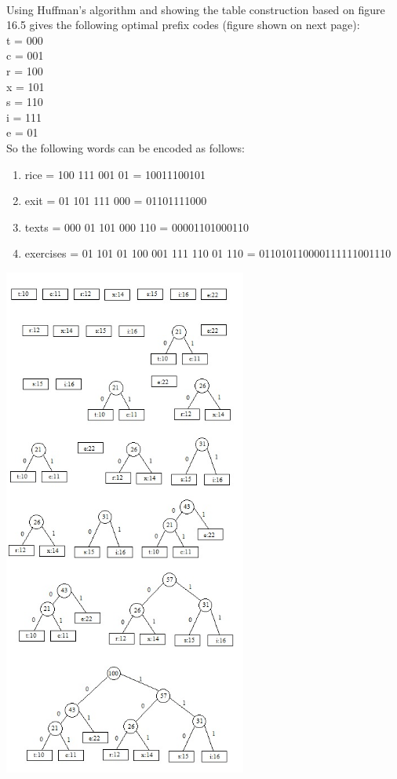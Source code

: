 \documentclass[addpoints,11pt]{exam}
\begin{document}
\begin{questions}
		\begin{solutionorbox} \\
			Using Huffman's algorithm and showing the table construction based on figure 16.5 gives the following optimal prefix codes (figure shown on next page): \\
			t = 000 \\
			c = 001 \\
			r = 100 \\
			x = 101 \\
			s = 110 \\
			i = 111 \\
			e = 01 \\
			So the following words can be encoded as follows:
			\begin{enumerate}
				\item rice = 100 111 001 01 = 10011100101
				\item exit = 01 101 111 000 = 01101111000 
				\item texts = 000 01 101 000 110 = 00001101000110
				\item exercises = 01 101 01 100 001 111 110 01 110 = 011010110000111111001110
			\end{enumerate}
			\includegraphics[width=0.6\textwidth]{huffmans.jpg}
		\end{solutionorbox}
		

\end{questions}
\end{document}
